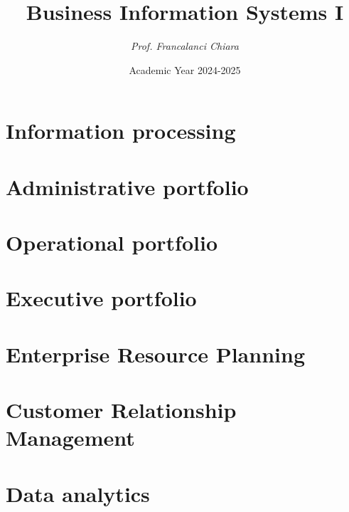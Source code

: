 \documentclass[12pt, a4paper]{report}
\title{\textbf{Business Information Systems I}}
\author{\textit{Prof. Francalanci Chiara}}
\date{Academic Year 2024-2025}
\begin{document}
    \maketitle

    

    \cleardoublepage{}

    \tableofcontents

    \cleardoublepage{}

    \chapter{Information processing}
    
    
    
    
    

    \chapter{Administrative portfolio}
    
    

    \chapter{Operational portfolio}
    
    

    \chapter{Executive portfolio}
    
    
    

    \chapter{Enterprise Resource Planning}
    
    

    \chapter{Customer Relationship Management}
    
    
    

    \chapter{Data analytics}
    
    
    
    
    
\end{document}
